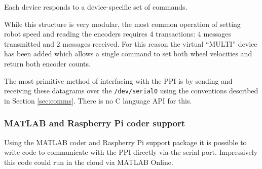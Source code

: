 \documentclass[11pt,fleqn]{article}
\begin{document}
Each device responds to a device-specific set of commands.

While this structure is very modular, the most common operation of setting robot speed and reading the encoders requires 4 
transactions: 4 messages transmitted and 2 messages received. For this reason the virtual ``MULTI'' device has been added which
allows a single command to set both wheel velocities and return both encoder counts.

The most primitive method of interfacing with the PPI is by sending and receiving these datagrams over the \texttt{/dev/serial0} using the conventions described in Section \ref{sec:comms}.  There is no C language API for this. 

\subsubsection{MATLAB and Raspberry Pi coder support}
Using the MATLAB coder and Raspberry Pi support package it is possible to write code to communicate with the PPI directly via
the serial port.  Impressively this code could run in the cloud via MATLAB Online.
\end{document}
